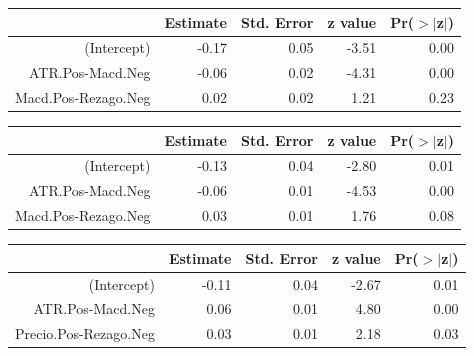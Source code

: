 \documentclass[a4paper,12pt]{Latex/Classes/PhDthesisPSnPDF}
\begin{document}
\begin{center}
\begin{table}[ht]
\centering
\begin{tabular}{rrrrr}
  \hline
 & Estimate & Std. Error & z value & Pr($>$$|$z$|$) \\ 
  \hline
(Intercept) & -0.17 & 0.05 & -3.51 & 0.00 \\ 
  ATR.Pos-Macd.Neg & -0.06 & 0.02 & -4.31 & 0.00 \\ 
  Macd.Pos-Rezago.Neg & 0.02 & 0.02 & 1.21 & 0.23 \\ 
   \hline
\end{tabular}
\end{table}\end{center}

\begin{center}
\begin{table}[ht]
\centering
\begin{tabular}{rrrrr}
  \hline
 & Estimate & Std. Error & z value & Pr($>$$|$z$|$) \\ 
  \hline
(Intercept) & -0.13 & 0.04 & -2.80 & 0.01 \\ 
  ATR.Pos-Macd.Neg & -0.06 & 0.01 & -4.53 & 0.00 \\ 
  Macd.Pos-Rezago.Neg & 0.03 & 0.01 & 1.76 & 0.08 \\ 
   \hline
\end{tabular}
\end{table}\end{center}

\newpage
\begin{center}
\begin{table}[ht]
\centering
\begin{tabular}{rrrrr}
  \hline
 & Estimate & Std. Error & z value & Pr($>$$|$z$|$) \\ 
  \hline
(Intercept) & -0.11 & 0.04 & -2.67 & 0.01 \\ 
  ATR.Pos-Macd.Neg & 0.06 & 0.01 & 4.80 & 0.00 \\ 
  Precio.Pos-Rezago.Neg & 0.03 & 0.01 & 2.18 & 0.03 \\ 
   \hline
\end{tabular}
\end{table}\end{center}
\end{document}
